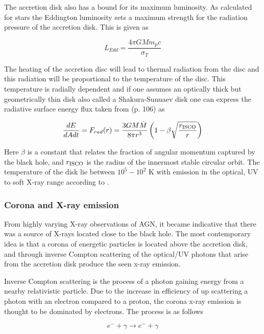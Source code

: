 The accretion disk also has a bound for its maximum luminosity. As calculated for stars the Eddington
luminosity sets a maximum strength for the radiation pressure of the accretion disk. This is given as



\begin{equation}
    L_{Edd} = \frac{4\pi G M m_p c}{\sigma_T}
    \label{eq:eddington_luminosity}
\end{equation}

The heating of the accretion disc will lead to thermal radiation from the disc and this radiation will be
proportional to the temperature of the disc. This temperature is radially dependent and if one assumes an optically thick but geometrically thin disk also called a Shakura-Sunuaev disk
one can express the radiative surface energy flux taken from \cite{BHradiation}(p. 106) as 

\begin{equation}
    \frac{dE}{dAdt}= F_{rad}(r) = \frac{3GM\dot{M}}{8\pi r^3}\left(1-\beta\sqrt{\frac{r_{\rm ISCO}}{r}}\right)
\end{equation}

Here $\beta$ is a constant that relates the fraction of angular momentum captured by the black hole, and $r_{\rm ISCO}$ is the radius of the innermost stable circular orbit. 
The temperature of the disk lie between $10^5 - 10^2$ K with emission in the optical, UV to soft X-ray range according to \cite{scholarpedia_accretion_discs}.


\subsubsection{Corona and X-ray emission}
From highly varying X-ray observations of AGN, it became indicative that there was a source of X-rays located close to the black hole. 
The most contemporary idea is that a corona of energetic particles is located above the accretion disk, and through inverse Compton scattering
of the optical/UV photons that arise from the accretion disk produce the seen x-ray emission. 

Inverse Compton scattering is the process of a photon gaining energy from a nearby relativistic particle. Due to the increase in efficiency 
of up scattering a photon with an electron compared to a proton, the corona x-ray emission is thought to be dominated by electrons. The process is as follows

\begin{equation}
    e^- + \gamma \rightarrow e^- + \gamma 
\end{equation}





